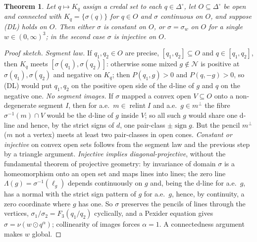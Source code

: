 \documentclass[11pt]{article}
\newtheorem{theorem}{Theorem}[section]
\theoremstyle{definition}
\theoremstyle{remark}
\newcommand{\Di}{\Delta^{\circ}}
\newcommand{\relint}{\operatorname{relint}}
\begin{document}
\begin{theorem}\label{thm:D}
Let $q\mapsto K_q$ assign a credal set to each $q\in\Di$, let $O\subseteq\Di$ be open and connected with $K_q=\{\sigma(q)\}$ for $q\in O$ and $\sigma$ continuous on $O$, and suppose (DL) holds on $O$. Then either $\sigma$ is constant on $O$, or $\sigma=\sigma_w$ on $O$ for a single $w\in(0,\infty)^3$; in the second case $\sigma$ is injective on $O$.
\end{theorem}
\begin{proof}[Proof sketch]
\emph{Segment law.} If $q_1,q_2\in O$ are precise, $[q_1,q_2]\subseteq O$ and $q\in[q_1,q_2]$, then $K_q$ meets $[\sigma(q_1),\sigma(q_2)]$: otherwise some mixed $g\notin\mathcal N$ is positive at $\sigma(q_1),\sigma(q_2)$ and negative on $K_q$; then $P(q_1,g)>0$ and $P(q,-g)>0$, so (DL) would put $q_1,q_2$ on the positive open side of the d-line of $g$ and $q$ on the negative one. \emph{No segment images.} If $\sigma$ mapped a convex open $V\subseteq O$ onto a non-degenerate segment $I$, then for a.e.\ $m\in\relint I$ and a.e.\ $g\in m^\perp$ the fibre $\sigma^{-1}(m)\cap V$ would be the d-line of $g$ inside $V$; so all such $g$ would share one d-line and hence, by the strict signs of $d$, one pair-class $\pm\operatorname{sign}g$. But the pencil $m^\perp$ ($m$ not a vertex) meets at least two pair-classes in open cones. \emph{Constant or injective} on convex open sets follows from the segment law and the previous step by a triangle argument. \emph{Injective implies diagonal-projective}, without the fundamental theorem of projective geometry: by invariance of domain $\sigma$ is a homeomorphism onto an open set and maps lines into lines; the zero line $\Lambda(g)=\sigma^{-1}(\ell_g)$ depends continuously on $g$ and, being the d-line for a.e.\ $g$, has a normal with the strict sign pattern of $g$ for a.e.\ $g$, hence, by continuity, a zero coordinate where $g$ has one. So $\sigma$ preserves the pencils of lines through the vertices, $\sigma_1/\sigma_2=F_3(q_1/q_2)$ cyclically, and a Pexider equation gives $\sigma=\nu(w\odot q^{\alpha})$; collinearity of images forces $\alpha=1$. A connectedness argument makes $w$ global.
\end{proof}
\end{document}
